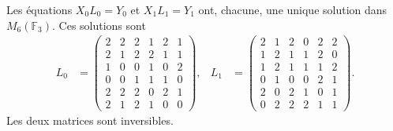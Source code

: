 \begin{theorem}
\label{thm:df-elevaciones-reconstruidas}
Les équations \(X_0L_0=Y_0\) et \(X_1L_1=Y_1\) ont, chacune, une
unique solution dans \(M_6(\mathbb F_3)\). Ces solutions sont
\begin{align*}
 L_0&=\begin{pmatrix}
2&2&2&1&2&1\\2&1&2&2&1&1\\1&0&0&1&0&2\\
0&0&1&1&1&0\\2&2&2&0&2&1\\2&1&2&1&0&0
\end{pmatrix},&
 L_1&=\begin{pmatrix}
2&1&2&0&2&2\\1&2&1&1&2&0\\1&2&1&1&1&2\\
0&1&0&0&2&1\\2&0&2&1&0&1\\0&2&2&2&1&1
\end{pmatrix}.
\end{align*}
Les deux matrices sont inversibles.
\end{theorem}

